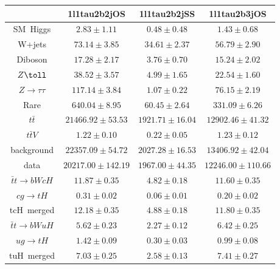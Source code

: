 \centering
\begin{tabular}{|c|c|c|c|} \hline
 & 1l1tau2b2jOS & 1l1tau2b2jSS & 1l1tau2b3jOS\\\hline
SM~Higgs & $2.83\pm1.11$ & $0.48\pm0.48$ & $1.43\pm0.68$\\\hline
W+jets & $73.14\pm3.85$ & $34.61\pm2.37$ & $56.79\pm2.90$\\\hline
Diboson & $17.28\pm2.17$ & $3.76\pm0.70$ & $15.24\pm2.02$\\\hline
$Z\toll$ & $38.52\pm3.57$ & $4.99\pm1.65$ & $22.54\pm1.60$\\\hline
$Z\to\tau\tau$ & $117.14\pm3.84$ & $1.07\pm0.22$ & $76.15\pm2.19$\\\hline
Rare & $640.04\pm8.95$ & $60.45\pm2.64$ & $331.09\pm6.26$\\\hline
$t\bar{t}$ & $21466.92\pm53.53$ & $1921.71\pm16.04$ & $12902.46\pm41.32$\\\hline
$t\bar{t}V$ & $1.22\pm0.10$ & $0.22\pm0.05$ & $1.23\pm0.12$\\\hline
background & $22357.09\pm54.72$ & $2027.28\pm16.53$ & $13406.92\pm42.04$\\\hline
data & $20217.00\pm142.19$ & $1967.00\pm44.35$ & $12246.00\pm110.66$\\\hline
$\bar{t}t\to bWcH$ & $11.87\pm0.35$ & $4.82\pm0.18$ & $11.60\pm0.35$\\\hline
$cg\to tH$ & $0.31\pm0.02$ & $0.06\pm0.01$ & $0.20\pm0.02$\\\hline
tcH~merged & $12.18\pm0.35$ & $4.88\pm0.18$ & $11.80\pm0.35$\\\hline
$\bar{t}t\to bWuH$ & $5.62\pm0.23$ & $2.27\pm0.12$ & $6.42\pm0.25$\\\hline
$ug\to tH$ & $1.42\pm0.09$ & $0.30\pm0.03$ & $0.99\pm0.08$\\\hline
tuH~merged & $7.03\pm0.25$ & $2.58\pm0.13$ & $7.41\pm0.27$\\\hline
\end{tabular}
